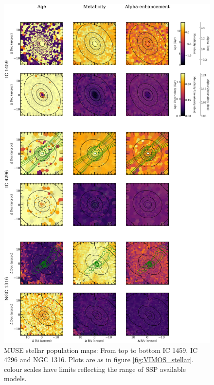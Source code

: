		\begin{figure}
			\centering
			\includegraphics[height=0.94\textheight]{chapter4/muse/pop1.png}
			\caption[MUSE stellar population maps]{MUSE stellar population maps: From top to bottom IC 1459, IC 4296 and NGC 1316. Plots are as in figure \ref{fig:VIMOS_stellar}. colour scales have limits reflecting the range of SSP available models.}
			\label{fig:MUSE_pop}
		\end{figure}
